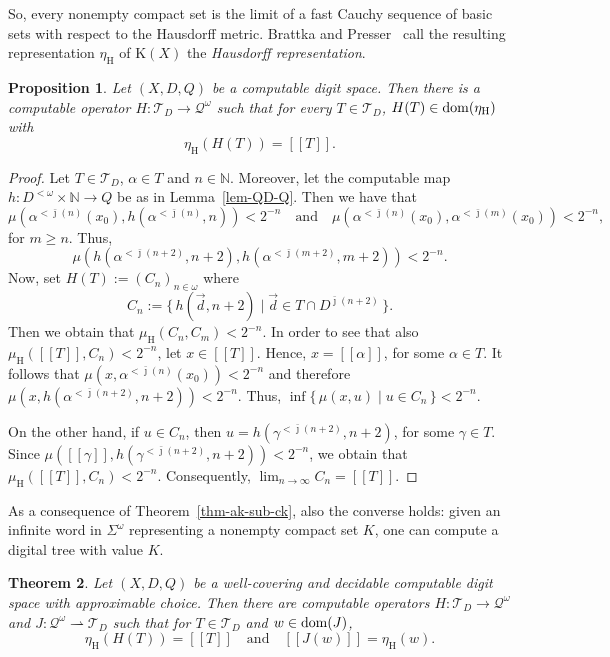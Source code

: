 \documentclass[microtype]{jloganal}
\theoremstyle{plain}
\newtheorem{theorem}{Theorem}[section]
\newtheorem{proposition}[theorem]{Proposition}
\theoremstyle{definition}
\newcommand{\NN}{\mathbb{N}}
\newcommand{\QQQ}{\mathcal{Q}}
\newcommand{\TTT}{\mathcal{T}}
\newcommand{\compact}{\mathrm{K}}
\newcommand{\hdm}{\mu_{\mathrm H}}
\newcommand{\hdr}{\eta_\mathrm{H}}
\newcommand{\val}[1]{[\![#1]\!]}
\newcommand{\set}[2]{\mbox{$\{\,#1 \mid #2 \,\}$}}
\newcommand{\fun}[3]{\mbox{$#1 \colon #2 \rightarrow #3$}}
\newcommand{\pfun}[3]{\mbox{$#1 \colon #2 \rightharpoonup #3$}}
\def\dom{\mathop{\mathstrut\rm dom}}
\begin{document}
So, every nonempty compact set is the limit of a fast Cauchy sequence of basic sets with respect to the Hausdorff metric. Brattka and Presser~\cite{BrattkaPresser03} call the resulting representation $\hdr$ of $\compact(X)$ the \emph{Hausdorff representation}.

\begin{proposition}\label{prop-treetohausdorff}
Let $(X, D, Q)$ be a computable digit space. Then there is a 
computable operator 
$\fun{H}{\TTT_D}{\QQQ^\omega}$ such that for every 
$T \in \TTT_D$, $H(T) \in \dom(\hdr)$ with 
\[
\hdr(H(T)) = \val{T}.
\]
\end{proposition}
\begin{proof}
Let $T \in \TTT_D$, $\alpha \in T$ and $n \in \NN$. Moreover, let the computable map $h \colon D^{<\omega} \times \NN \rightarrow Q$ be as in Lemma~\ref{lem-QD-Q}. Then we have that 
\[
\mu(\alpha^{<\bar{\jmath}(n)}(x_0), h(\alpha^{< \bar{\jmath}(n)}, n)) < 2^{-n} \quad\text{and}\quad
\mu(\alpha^{<\bar{\jmath}(n)}(x_0), \alpha^{<\bar{\jmath}(m)}(x_0)) < 2^{-n},
\]
for $m \ge n$. Thus,
\[
\mu(h(\alpha^{< \bar{\jmath}(n+2)}, n+2), h(\alpha^{< \bar{\jmath}(m+2)}, m+2)) < 2^{-n}.
\]
Now, set $H(T) := (C_n)_{n\in\omega}$ where
\[
C_n := \set{h(\vec d, n+2)}{\vec d \in T \cap D^{\bar{\jmath}(n+2)}}.
\]
Then we obtain that $\hdm(C_n, C_m) < 2^{-n}$. In order to see that also $\hdm(\val{T}, C_n) < 2^{-n}$, let $x \in \val{T}$. Hence, $x = \val{\alpha}$, for some $\alpha \in T$. It follows that $\mu(x, \alpha^{< \bar{\jmath}(n)}(x_0)) < 2^{-n}$ and therefore $\mu(x, h(\alpha^{< \bar{\jmath}(n+2)}, n+2)) < 2^{-n}$. Thus, $\inf\set{\mu(x, u)}{u \in C_n} < 2^{-n}$. 

On the other hand, if $u \in C_n$, then $u = h(\gamma^{< \bar{\jmath}(n+2)}, n+2)$, for some $\gamma \in T$. Since $\mu(\val{\gamma}, h(\gamma^{< \bar{\jmath}(n+2)}, n+2)) < 2^{-n}$, we obtain that $\hdm(\val{T}, C_n) < 2^{-n}$. Consequently, $\lim_{n \to \infty} C_n = \val{T}$.
\end{proof}

As a consequence of Theorem~\ref{thm-ak-sub-ck}, also the converse holds: given an infinite word in $\Sigma^\omega$ representing a nonempty compact set $K$, one can compute a digital tree with value $K$.

\begin{theorem}\label{thm-hausdorfftotree}
Let $(X, D, Q)$ be a well-covering and decidable computable digit space 
with approximable choice. Then there are computable operators 
$\fun{H}{\TTT_D}{\QQQ^\omega}$ and 
$\pfun{J}{\QQQ^\omega}{\TTT_D}$ 
such that for $T \in \TTT_D$ and $w \in \dom(J)$,
\[
\hdr(H(T)) = \val{T}\quad\text{and}\quad \val{J(w)} = \hdr(w).
\]
\end{theorem}
\end{document}
